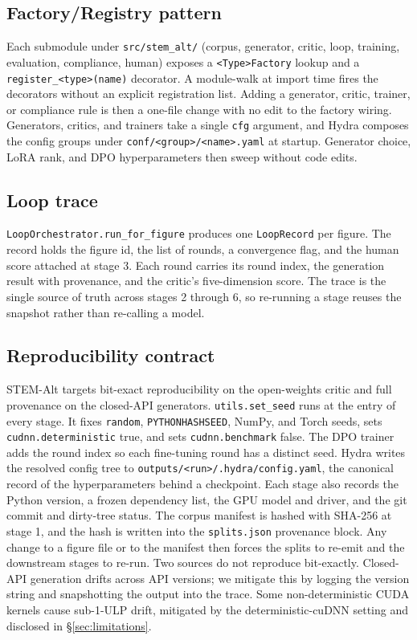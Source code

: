 \documentclass[pdflatex,sn-mathphys-num]{sn-jnl}
\begin{document}
\begin{appendices}
\subsection{Factory/Registry pattern}\label{app:factory}

Each submodule under \texttt{src/stem\_alt/} (corpus, generator, critic, loop, training, evaluation, compliance, human) exposes a \texttt{<Type>Factory} lookup and a \texttt{register\_<type>(name)} decorator. A module-walk at import time fires the decorators without an explicit registration list. Adding a generator, critic, trainer, or compliance rule is then a one-file change with no edit to the factory wiring. Generators, critics, and trainers take a single \texttt{cfg} argument, and Hydra composes the config groups under \texttt{conf/<group>/<name>.yaml} at startup. Generator choice, LoRA rank, and DPO hyperparameters then sweep without code edits.

\subsection{Loop trace}\label{app:trace}

\texttt{LoopOrchestrator.run\_for\_figure} produces one \texttt{LoopRecord} per figure. The record holds the figure id, the list of rounds, a convergence flag, and the human score attached at stage 3. Each round carries its round index, the generation result with provenance, and the critic's five-dimension score. The trace is the single source of truth across stages 2 through 6, so re-running a stage reuses the snapshot rather than re-calling a model.

\subsection{Reproducibility contract}\label{app:repro}

STEM-Alt targets bit-exact reproducibility on the open-weights critic and full provenance on the closed-API generators. \texttt{utils.set\_seed} runs at the entry of every stage. It fixes \texttt{random}, \texttt{PYTHONHASHSEED}, NumPy, and Torch seeds, sets \texttt{cudnn.deterministic} true, and sets \texttt{cudnn.benchmark} false. The DPO trainer adds the round index so each fine-tuning round has a distinct seed. Hydra writes the resolved config tree to \texttt{outputs/<run>/.hydra/config.yaml}, the canonical record of the hyperparameters behind a checkpoint. Each stage also records the Python version, a frozen dependency list, the GPU model and driver, and the git commit and dirty-tree status. The corpus manifest is hashed with SHA-256 at stage 1, and the hash is written into the \texttt{splits.json} provenance block. Any change to a figure file or to the manifest then forces the splits to re-emit and the downstream stages to re-run. Two sources do not reproduce bit-exactly. Closed-API generation drifts across API versions; we mitigate this by logging the version string and snapshotting the output into the trace. Some non-deterministic CUDA kernels cause sub-1-ULP drift, mitigated by the deterministic-cuDNN setting and disclosed in \S\ref{sec:limitations}.


\end{appendices}
\end{document}
